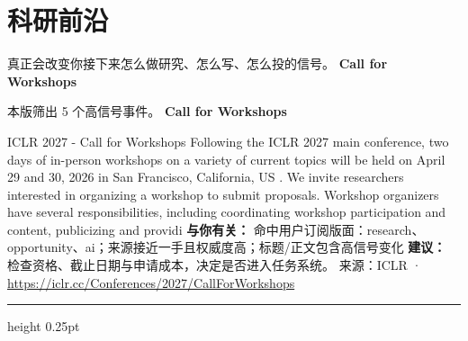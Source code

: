 \documentclass[10.5pt]{ctexart}
\begin{document}
\section*{科研前沿}
{\color{ormuted} 真正会改变你接下来怎么做研究、怎么写、怎么投的信号。}
\vspace{2mm}
{\LARGE\bfseries Call for Workshops}\par
\vspace{1mm}
{\color{ormuted} 本版筛出 5 个高信号事件。}
\vspace{3mm}
{\Large\bfseries Call for Workshops}\par
ICLR 2027 - Call for Workshops Following the ICLR 2027 main conference, two days of in-person workshops on a variety of current topics will be held on April 29 and 30, 2026 in San Francisco, California, US . We invite researchers interested in organizing a workshop to submit proposals. Workshop organizers have several responsibilities, including coordinating workshop participation and content, publicizing and providi
\textbf{与你有关：} 命中用户订阅版面：research、opportunity、ai；来源接近一手且权威度高；标题/正文包含高信号变化
\textbf{建议：} 检查资格、截止日期与申请成本，决定是否进入任务系统。
{\footnotesize\color{ormuted} 来源：ICLR · \url{https://iclr.cc/Conferences/2027/CallForWorkshops}}
\vspace{4mm}
\hrule height 0.25pt
\vspace{3mm}
\end{document}
